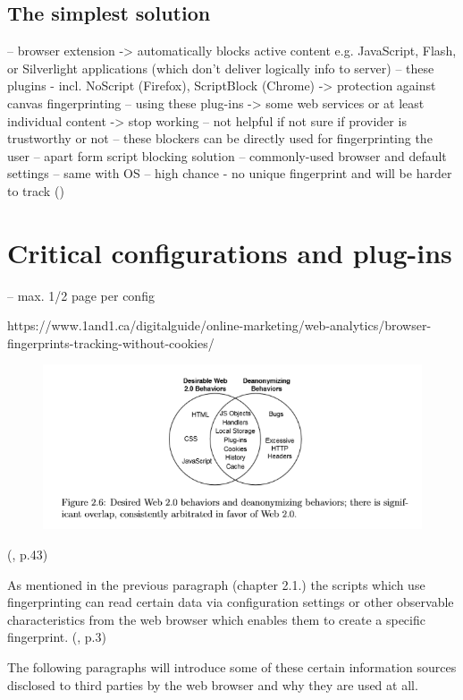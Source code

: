 \subsection{The simplest solution}

-- browser extension -> automatically blocks active content e.g. JavaScript, Flash, or Silverlight applications (which don't deliver logically info to server)
-- these plugins - incl. NoScript (Firefox), ScriptBlock (Chrome) -> protection against canvas fingerprinting
-- using these plug-ins -> some web services or at least individual content -> stop working
-- not helpful if not sure if provider is trustworthy or not
-- these blockers can be directly used for fingerprinting the user
-- apart form script blocking solution
-- commonly-used browser and default settings
-- same with OS
-- high chance - no unique fingerprint and will be harder to track
(\textcite{web17})



\newpage
\section{Critical configurations and plug-ins}
-- max. 1/2 page per config

https://www.1and1.ca/digitalguide/online-marketing/web-analytics/browser-fingerprints-tracking-without-cookies/

\begin{figure}
	\centering
	\includegraphics[width=0.7\linewidth]{images/dangerousConfigs}
	\caption{}
	\label{fig:dangerousconfigs}
\end{figure}
(\textcite{mayer09}, p.43)

As mentioned in the previous paragraph (chapter 2.1.) the scripts which use fingerprinting can read certain data via configuration settings or other observable characteristics from the web browser which enables them to create a specific fingerprint. (\textcite{doty18}, p.3)

The following paragraphs will introduce some of these certain information sources disclosed to third parties by the web browser and why they are used at all.


